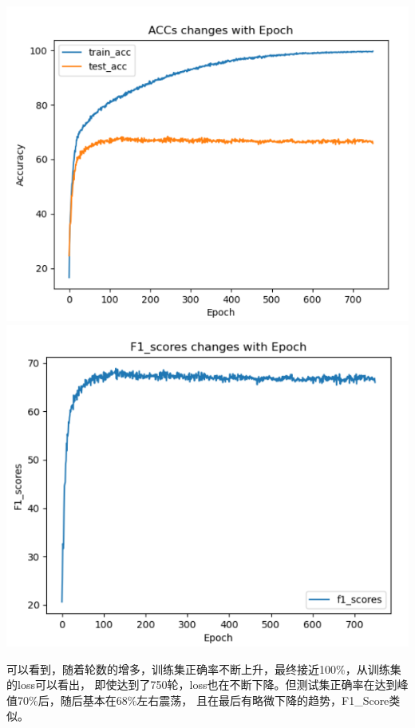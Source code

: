 \documentclass[11pt]{article}
\begin{document}
            \begin{center}
                \includegraphics[scale=1]{graph/result5.png}\\
                \includegraphics[scale = 0.9]{graph/result6.png}\\
            \end{center}

            可以看到，随着轮数的增多，训练集正确率不断上升，最终接近100\%，从训练集的loss可以看出，
            即使达到了750轮，loss也在不断下降。但测试集正确率在达到峰值70\%后，随后基本在68\%左右震荡，
            且在最后有略微下降的趋势，F1\_Score类似。
            
\end{document}
